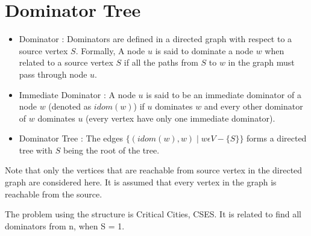     \section{Dominator Tree}
    \begin{itemize}
        \item Dominator : Dominators are defined in a directed graph with respect to a source vertex $S$. Formally, A node $u$ is said to dominate a node $w$ when related to a source vertex $S$ if all the paths from $S$ to $w$ in the graph must pass through node $u$.
        \item Immediate Dominator : A node $u$ is said to be an immediate dominator of a node $w$ (denoted as $idom(w)$) if $u$ dominates $w$ and every other dominator of $w$ dominates $u$ (every vertex have only one immediate dominator).
        \item Dominator Tree :  The edges $\big\{(idom(w),w) \mid w \epsilon V - \big\{S\big\} \big\}$ forms a directed tree with $S$ being the root of the tree.
    \end{itemize}
    
    Note that only the vertices that are reachable from source vertex in the directed graph are considered here. It is assumed that every vertex in the graph is reachable from the source.

    The problem using the structure is Critical Cities, CSES.
    It is related to find all dominators from n, when S = 1.
